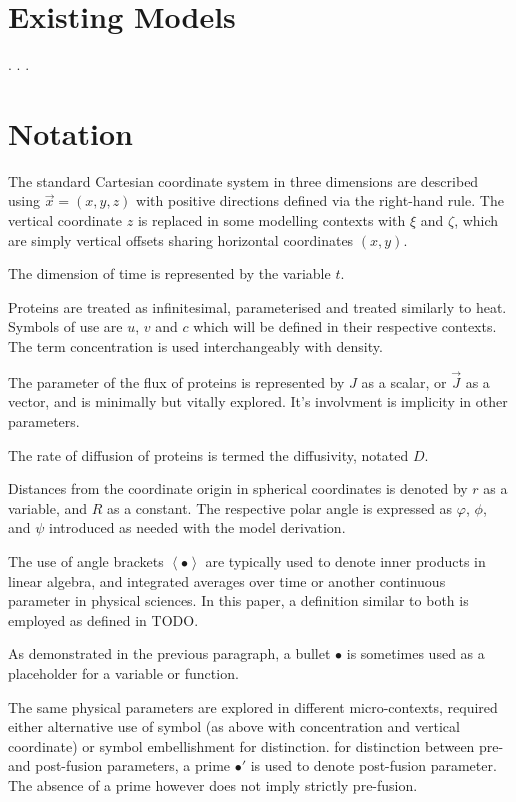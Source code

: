 \documentclass{report}
\newcommand\Angle[1]{{ \left\langle{#1}\right\rangle }}
\newcommand{\ze}{{ \zeta }}
\begin{document}
\section{Existing Models}
\cite{marrink2019computational}.
\cite{jorgensen2017computer}.
\cite{risselada2020proteins}.

\section{Notation}
The standard Cartesian coordinate system in three dimensions are described using $\vec{x} = (x, y, z)$ with positive directions defined via the right-hand rule. The vertical coordinate $z$ is replaced in some modelling contexts with $\xi$ and $\ze$, which are simply vertical offsets sharing horizontal coordinates $(x, y)$.

The dimension of time is represented by the variable $t$.

Proteins are treated as infinitesimal, parameterised and treated similarly to heat. Symbols of use are $u$, $v$ and $c$ which will be defined in their respective contexts. The term concentration is used interchangeably with density.

The parameter of the flux of proteins is represented by $J$ as a scalar, or $\vec{J}$ as a vector, and is minimally but vitally explored. It's involvment is implicity in other parameters.

The rate of diffusion of proteins is termed the diffusivity, notated $D$.

Distances from the coordinate origin in spherical coordinates is denoted by $r$ as a variable, and $R$ as a constant. The respective polar angle is expressed as $\varphi$, $\phi$, and $\psi$ introduced as needed with the model derivation.

The use of angle brackets $\Angle{\bullet}$ are typically used to denote inner products in linear algebra, and integrated averages over time or another continuous parameter in physical sciences. In this paper, a definition similar to both is employed as defined in TODO.

As demonstrated in the previous paragraph, a bullet $\bullet$ is sometimes used as a placeholder for a variable or function.

The same physical parameters are explored in different micro-contexts, required either alternative use of symbol (as above with concentration and vertical coordinate) or symbol embellishment for distinction. for distinction between pre- and post-fusion parameters, a prime $\bullet'$ is used to denote post-fusion parameter. The absence of a prime however does not imply strictly pre-fusion.
\end{document}
